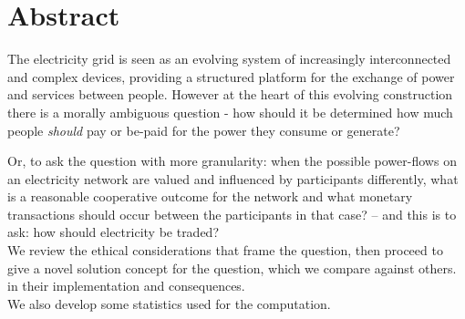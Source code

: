 \chapter*{Abstract}
\vspace{-1em}
The electricity grid is seen as an evolving system of increasingly interconnected and complex devices, providing a structured platform for the exchange of power and services between people.
However at the heart of this evolving construction there is a morally ambiguous question - how should it be determined how much people \textit{should} pay or be-paid for the power they consume or generate?

Or, to ask the question with more granularity: when the possible power-flows on an electricity network are valued and influenced by participants differently, 
what is a reasonable cooperative outcome for the network and what monetary transactions should occur between the participants in that case? -- and this is to ask: how should electricity be traded?\\

We review the ethical considerations that frame the question, then proceed to give a novel solution concept for the question, which we compare against others. in their implementation and consequences.\\

We also develop some statistics used for the computation.

